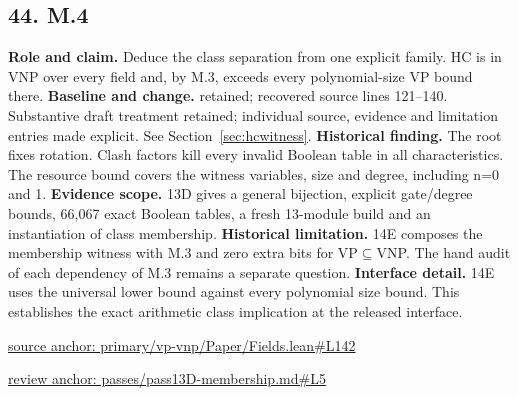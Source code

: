 \documentclass[11pt,letterpaper]{article}
\theoremstyle{definition}\newtheorem{definition}[theorem]{Definition}\newtheorem{example}[theorem]{Example}
\theoremstyle{remark}\newtheorem{remark}[theorem]{Remark}
\begin{document}
\subsection*{44. M.4}
\textbf{Role and claim.} Deduce the class separation from one explicit family. HC is in VNP over every field and, by M.3, exceeds every polynomial-size VP bound there.
\textbf{Baseline and change.} retained; recovered source lines 121--140. Substantive draft treatment retained; individual source, evidence and limitation entries made explicit. See Section~\ref{sec:hcwitness}.
\textbf{Historical finding.} The root fixes rotation. Clash factors kill every invalid Boolean table in all characteristics. The resource bound covers the witness variables, size and degree, including n=0 and 1.
\textbf{Evidence scope.} 13D gives a general bijection, explicit gate/degree bounds, 66,067 exact Boolean tables, a fresh 13-module build and an instantiation of class membership.
\textbf{Historical limitation.} 14E composes the membership witness with M.3 and zero extra bits for VP\ensuremath{\subseteq}VNP. The hand audit of each dependency of M.3 remains a separate question.
\textbf{Interface detail.} 14E uses the universal lower bound against every polynomial size bound. This establishes the exact arithmetic class implication at the released interface.
\par\href{https://github.com/nousentllc/VP-VNP-Review/blob/8a7976933b6b2b4ffda1ad3a0dfb5fc6b6f023e8/primary/vp-vnp/Paper/Fields.lean\#L142}{source anchor: primary/vp-vnp/Paper/Fields.lean\#L142}
\par\href{https://github.com/nousentllc/VP-VNP-Review/blob/8a7976933b6b2b4ffda1ad3a0dfb5fc6b6f023e8/passes/pass13D-membership.md\#L5}{review anchor: passes/pass13D-membership.md\#L5}
\goodbreak
\end{document}
